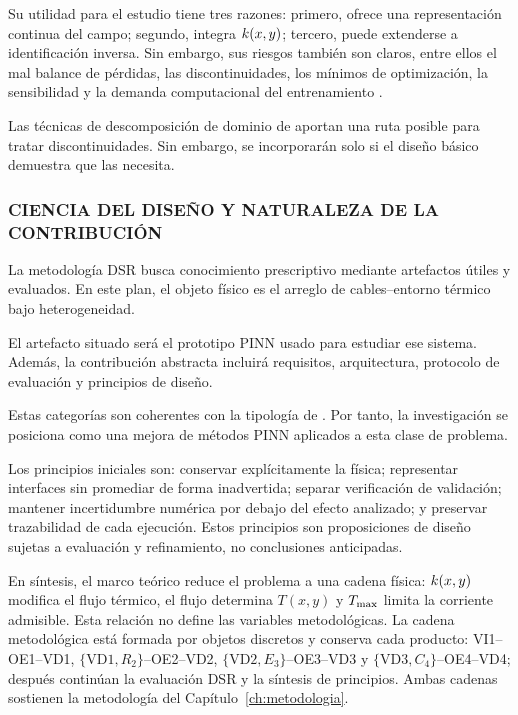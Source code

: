 Su utilidad para el estudio tiene tres razones: primero, ofrece una representación continua del campo; segundo, integra $k(x,y)$; tercero, puede extenderse a identificación inversa. Sin embargo, sus riesgos también son claros, entre ellos el mal balance de pérdidas, las discontinuidades, los mínimos de optimización, la sensibilidad y la demanda computacional del entrenamiento \parencites[2--6]{ren2025}[16]{pan2025}.

Las técnicas de descomposición de dominio de \textcite[1--2]{shukla2021} aportan una ruta posible para tratar discontinuidades. Sin embargo, se incorporarán solo si el diseño básico demuestra que las necesita.

\subsubsection{CIENCIA DEL DISEÑO Y NATURALEZA DE LA CONTRIBUCIÓN}
\label{subsec:dsr-contribucion}

La metodología DSR busca conocimiento prescriptivo mediante artefactos útiles y evaluados. En este plan, el objeto físico es el arreglo de cables--entorno térmico bajo heterogeneidad.

El artefacto situado será el prototipo PINN usado para estudiar ese sistema. Además, la contribución abstracta incluirá requisitos, arquitectura, protocolo de evaluación y principios de diseño.

Estas categorías son coherentes con la tipología de \textcite[343--349]{gregor2013}. Por tanto, la investigación se posiciona como una mejora de métodos PINN aplicados a esta clase de problema.

Los principios iniciales son: conservar explícitamente la física; representar interfaces sin promediar de forma inadvertida; separar verificación de validación; mantener incertidumbre numérica por debajo del efecto analizado; y preservar trazabilidad de cada ejecución. Estos principios son proposiciones de diseño sujetas a evaluación y refinamiento, no conclusiones anticipadas.

En síntesis, el marco teórico reduce el problema a una cadena física: $k(x,y)$ modifica el flujo térmico, el flujo determina $T(x,y)$ y $T_{\max}$ limita la corriente admisible. Esta relación no define las variables metodológicas. La cadena metodológica está formada por objetos discretos y conserva cada producto: VI1--OE1--VD1, $\{\mathrm{VD1},R_2\}$--OE2--VD2, $\{\mathrm{VD2},E_3\}$--OE3--VD3 y $\{\mathrm{VD3},C_4\}$--OE4--VD4; después continúan la evaluación DSR y la síntesis de principios. Ambas cadenas sostienen la metodología del Capítulo~\ref{ch:metodologia}.

